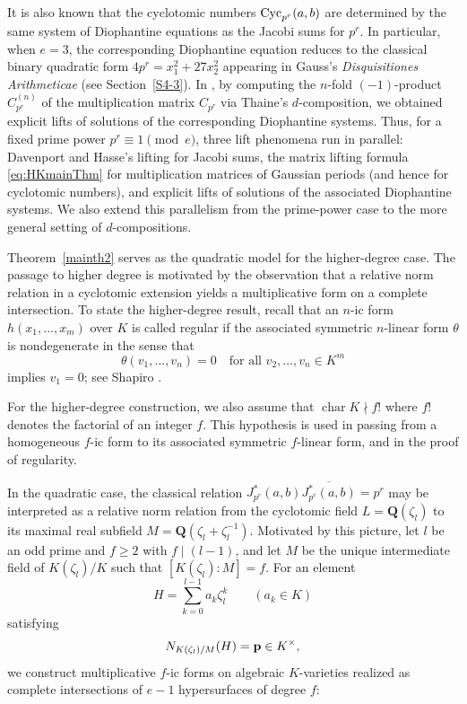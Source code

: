 \documentclass[a4paper, 11pt]{amsart}
\theoremstyle{plain}
\theoremstyle{definition}
\numberwithin{equation}{section}
\begin{document}
It is also known that the cyclotomic numbers ${\rm Cyc}_{p^r}(a,b)$ are determined by the same system of Diophantine equations as the Jacobi sums for $p^r$. 
In particular, when $e=3$, the corresponding Diophantine equation reduces to the classical binary quadratic form $4p^r=x_1^2+27x_2^2$ appearing in Gauss's \emph{Disquisitiones Arithmeticae} (see Section~\ref{S4-3}). 
In \cite[Section 7]{HK22}, by computing the $n$-fold $(-1)$-product $C_{p^r}^{(n)}$ of the multiplication matrix $C_{p^r}$ via Thaine's $d$-composition, we obtained explicit lifts of solutions of the corresponding Diophantine systems. 
Thus, for a fixed prime power $p^r \equiv 1 \pmod e$, three lift phenomena run in parallel: Davenport and Hasse's lifting for Jacobi sums, the matrix lifting formula \eqref{eq:HKmainThm} for multiplication matrices of Gaussian periods (and hence for cyclotomic numbers), and explicit lifts of solutions of the associated Diophantine systems. 
We also extend this parallelism from the prime-power case to the more general setting of $d$-compositions.

Theorem~\ref{mainth2} serves as the quadratic model for the higher-degree case.
The passage to higher degree is motivated by the observation that a relative norm relation in a cyclotomic extension yields a multiplicative form on a complete intersection.
To state the higher-degree result, recall that an $n$-ic form
$h(x_1,\dots,x_m)$ over $K$ is called regular if the associated symmetric $n$-linear form
$\theta$ is nondegenerate in the sense that
\[
\theta(v_1,\dots,v_n)=0 \quad \text{for all } v_2,\dots,v_n \in K^m
\]
implies $v_1=0$; see Shapiro \cite[Chapter~16]{Sha00}.

For the higher-degree construction, we also assume that $\operatorname{char} K \nmid f!$ where $f!$ denotes the factorial of  an integer $f$. 
This hypothesis is used in passing from a homogeneous $f$-ic form to its associated symmetric $f$-linear form, and in the proof of regularity.

In the quadratic case, the classical relation $J^{*}_{p^r}(a,b)\overline{J^{*}_{p^r}(a,b)} = p^r$ may be interpreted as a relative norm relation from the cyclotomic field $L=\mathbf{Q}(\zeta_l)$ to its maximal real subfield $M=\mathbf{Q}(\zeta_l+\zeta_l^{-1})$. 
Motivated by this picture, let $l$ be an odd prime and $f \ge 2$ with $f \mid (l-1)$, and let $M$ be the unique intermediate field of $K(\zeta_l)/K$ such that $[K(\zeta_l):M]=f$. 
For an element
\[
H=\sum_{k=0}^{l-1} a_k \zeta_l^k \qquad (a_k \in K)
\]
satisfying
\[
N_{K(\zeta_l)/M}(H)={\bf p} \in K^\times,
\]
we construct multiplicative $f$-ic forms on algebraic $K$-varieties realized as complete intersections
of $e-1$ hypersurfaces of degree $f$:
\end{document}
